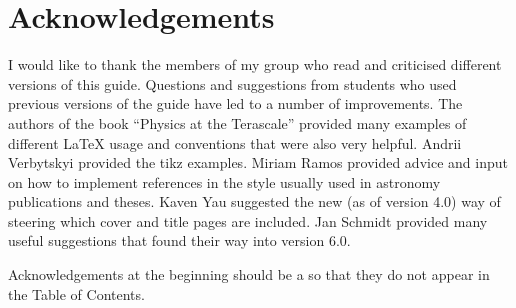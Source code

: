 \chapter*{Acknowledgements}%
\label{sec:ack1}

I would like to thank the members of my group who read and criticised
different versions of this guide. Questions and suggestions from
students who used previous versions of the guide have led to a number
of improvements. The authors of the book \enquote{Physics at the
Terascale} provided many examples of different \LaTeX{} usage and
conventions that were also very helpful. Andrii Verbytskyi provided
the tikz examples.
Miriam Ramos provided advice and input on how to implement references 
in the style usually used in astronomy publications and theses.
Kaven Yau suggested the new (as of version 4.0) way of steering which cover
and title pages are included.
Jan Schmidt provided many useful suggestions that found their way into version 6.0.

Acknowledgements at the beginning should be a  so that they
do not appear in the Table of Contents.

